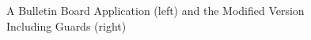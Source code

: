 \begin{figure}[h]
    \centering
    \begin{subfigure}[b]{0.48\textwidth} 
       \label{fig:app1}
    \end{subfigure} ~
       \begin{subfigure}[b]{0.52\textwidth} 
        \label{fig:app2}
    \end{subfigure}\\
    \hrulefill
    \caption{A Bulletin Board Application (left) and the Modified Version Including Guards (right) }
\end{figure}
